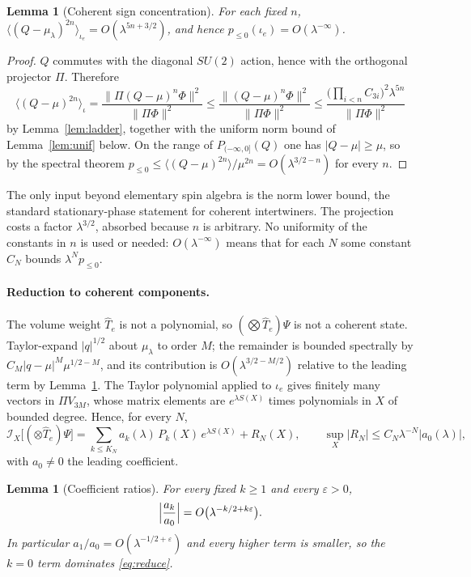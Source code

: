 \documentclass[11pt]{article}
\numberwithin{equation}{section}
\newtheorem{lemma}[theorem]{Lemma}
\theoremstyle{definition}
\theoremstyle{remark}
\newcommand{\SUtwo}{SU(2)}
\begin{document}
\begin{lemma}[Coherent sign concentration]\label{lem:conc}
For each fixed $n$,
$\langle(Q-\mu_\lambda)^{2n}\rangle_{\iota_e}=O(\lambda^{5n+3/2})$, and hence
$p_{\le0}(\iota_e)=O(\lambda^{-\infty})$.
\end{lemma}

\begin{proof}
$Q$ commutes with the diagonal $\SUtwo$ action, hence with the orthogonal
projector $\Pi$. Therefore
\[
\langle(Q-\mu)^{2n}\rangle_{\iota}
=\frac{\|\Pi(Q-\mu)^n\Phi\|^2}{\|\Pi\Phi\|^2}
\le\frac{\|(Q-\mu)^n\Phi\|^2}{\|\Pi\Phi\|^2}
\le\frac{\bigl(\prod_{i<n}C_{3i}\bigr)^2\lambda^{5n}}{\|\Pi\Phi\|^2}
\]
by Lemma~\ref{lem:ladder}, together with the uniform norm bound of
Lemma~\ref{lem:unif} below. On the range of $P_{(-\infty,0]}(Q)$ one has
$|Q-\mu|\ge\mu$, so by the spectral theorem
$p_{\le0}\le\langle(Q-\mu)^{2n}\rangle/\mu^{2n}=O(\lambda^{3/2-n})$ for every $n$.
\end{proof}

The only input beyond elementary spin algebra is the norm lower bound, the
standard stationary-phase statement for coherent intertwiners. The projection
costs a factor $\lambda^{3/2}$, absorbed because $n$ is arbitrary. No uniformity
of the constants in $n$ is used or needed: $O(\lambda^{-\infty})$ means that for
each $N$ some constant $C_N$ bounds $\lambda^Np_{\le0}$.

\paragraph{Reduction to coherent components.}
The volume weight $\widehat T_e$ is not a polynomial, so
$(\bigotimes\widehat T_e)\Psi$ is not a coherent state. Taylor-expand $|q|^{1/2}$
about $\mu_\lambda$ to order $M$; the remainder is bounded spectrally by
$C_M|q-\mu|^M\mu^{1/2-M}$, and its contribution is $O(\lambda^{3/2-M/2})$ relative
to the leading term by Lemma~\ref{lem:conc}. The Taylor polynomial applied to
$\iota_e$ gives finitely many vectors in $\Pi V_{3M}$, whose matrix elements are
$e^{\lambda S(X)}$ times polynomials in $X$ of bounded degree. Hence, for every
$N$,
\begin{equation}\label{eq:reduce}
\mathcal I_X\bigl[(\otimes\widehat T_e)\Psi\bigr]
=\sum_{k\le K_N}a_k(\lambda)\,P_k(X)\,e^{\lambda S(X)}+R_N(X),\qquad
\sup_X|R_N|\le C_N\lambda^{-N}|a_0(\lambda)|,
\end{equation}
with $a_0\neq0$ the leading coefficient.

\begin{lemma}[Coefficient ratios]\label{lem:coeff}
For every fixed $k\ge1$ and every $\varepsilon>0$,
\[
\Bigl|\frac{a_k}{a_0}\Bigr|=O\bigl(\lambda^{-k/2+k\varepsilon}\bigr).
\]
In particular $a_1/a_0=O(\lambda^{-1/2+\varepsilon})$ and every higher term is
smaller, so the $k=0$ term dominates \eqref{eq:reduce}.
\end{lemma}
\end{document}
